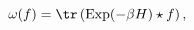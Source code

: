 \begin{equation}
        \label{eq:KMS}
        \omega(f) = \tr\left(\mathrm{Exp}(-\beta H) \star f\right),
    \end{equation}

